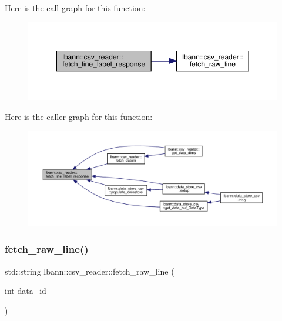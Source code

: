 Here is the call graph for this function\+:\nopagebreak
\begin{figure}[H]
\begin{center}
\leavevmode
\includegraphics[width=349pt]{classlbann_1_1csv__reader_ae00ba61c2b9db1595ff62ab61a218cfb_cgraph}
\end{center}
\end{figure}
Here is the caller graph for this function\+:\nopagebreak
\begin{figure}[H]
\begin{center}
\leavevmode
\includegraphics[width=350pt]{classlbann_1_1csv__reader_ae00ba61c2b9db1595ff62ab61a218cfb_icgraph}
\end{center}
\end{figure}
\mbox{\label{classlbann_1_1csv__reader_a8ea8669ec6c85de8d4127da7bb47d135}} 
\subsubsection{\texorpdfstring{fetch\+\_\+raw\+\_\+line()}{fetch\_raw\_line()}}
{\footnotesize\ttfamily std\+::string lbann\+::csv\+\_\+reader\+::fetch\+\_\+raw\+\_\+line (\begin{DoxyParamCaption}\item[{int}]{data\+\_\+id }\end{DoxyParamCaption})\hspace{0.3cm}{\ttfamily [protected]}}


